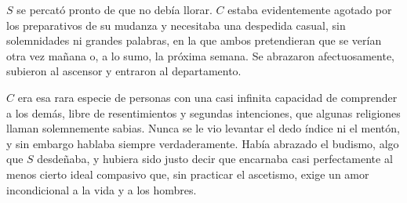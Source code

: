 \documentclass[a4paper, 12pt]{article}
\begin{document}
$S$ se percató pronto de que no debía llorar. $C$ estaba evidentemente agotado
por los preparativos de su mudanza y necesitaba una despedida casual, sin
solemnidades ni grandes palabras, en la que ambos pretendieran que se verían
otra vez mañana o, a lo sumo, la próxima semana. Se abrazaron afectuosamente,
subieron al ascensor y entraron al departamento.

$C$ era esa rara especie de personas con una casi infinita capacidad de
comprender a los demás, libre de resentimientos y segundas intenciones, que
algunas religiones llaman solemnemente sabias. Nunca se le vio levantar el dedo
índice ni el mentón, y sin embargo hablaba siempre verdaderamente. Había
abrazado el budismo, algo que $S$ desdeñaba, y hubiera sido justo decir que
encarnaba casi perfectamente al menos cierto ideal compasivo que, sin practicar
el ascetismo, exige un amor incondicional a la vida y a los hombres.
\end{document}
